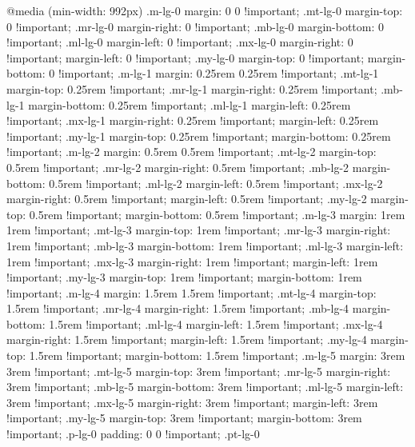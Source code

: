 {{{{{{{{{{{{{{{{{{{{{{{{{{{{{{{{{{{{{{{{{{{{{{{{{{{{{{{{{{{{{{{{{{{{{{{{{{{{{{{{{{{{{{{{{{{{{{{{{{{{{{{{{{{{{{{{{{{{{{{{{{{{{{{{{{{{{{{{{{{{{{{{{{{{{{{{{{{{{{{{{{{{{{{{{{{{{{{{{{{{{{{{{{{{{{{{{{{{{{{{{{{{{{{{{{{{{{{{{{{{{{{{{{{{{{{{{{{{{{{{{{{{{{{{{{{{{{{{{{{{{{{{{{{{{{{{{{{{{{{{{{{{{{{{{{{{{{{{{{{{{{{{{{@media (min-width: 992px) {
  .m-lg-0 {
    margin: 0 0 !important; }
  .mt-lg-0 {
    margin-top: 0 !important; }
  .mr-lg-0 {
    margin-right: 0 !important; }
  .mb-lg-0 {
    margin-bottom: 0 !important; }
  .ml-lg-0 {
    margin-left: 0 !important; }
  .mx-lg-0 {
    margin-right: 0 !important;
    margin-left: 0 !important; }
  .my-lg-0 {
    margin-top: 0 !important;
    margin-bottom: 0 !important; }
  .m-lg-1 {
    margin: 0.25rem 0.25rem !important; }
  .mt-lg-1 {
    margin-top: 0.25rem !important; }
  .mr-lg-1 {
    margin-right: 0.25rem !important; }
  .mb-lg-1 {
    margin-bottom: 0.25rem !important; }
  .ml-lg-1 {
    margin-left: 0.25rem !important; }
  .mx-lg-1 {
    margin-right: 0.25rem !important;
    margin-left: 0.25rem !important; }
  .my-lg-1 {
    margin-top: 0.25rem !important;
    margin-bottom: 0.25rem !important; }
  .m-lg-2 {
    margin: 0.5rem 0.5rem !important; }
  .mt-lg-2 {
    margin-top: 0.5rem !important; }
  .mr-lg-2 {
    margin-right: 0.5rem !important; }
  .mb-lg-2 {
    margin-bottom: 0.5rem !important; }
  .ml-lg-2 {
    margin-left: 0.5rem !important; }
  .mx-lg-2 {
    margin-right: 0.5rem !important;
    margin-left: 0.5rem !important; }
  .my-lg-2 {
    margin-top: 0.5rem !important;
    margin-bottom: 0.5rem !important; }
  .m-lg-3 {
    margin: 1rem 1rem !important; }
  .mt-lg-3 {
    margin-top: 1rem !important; }
  .mr-lg-3 {
    margin-right: 1rem !important; }
  .mb-lg-3 {
    margin-bottom: 1rem !important; }
  .ml-lg-3 {
    margin-left: 1rem !important; }
  .mx-lg-3 {
    margin-right: 1rem !important;
    margin-left: 1rem !important; }
  .my-lg-3 {
    margin-top: 1rem !important;
    margin-bottom: 1rem !important; }
  .m-lg-4 {
    margin: 1.5rem 1.5rem !important; }
  .mt-lg-4 {
    margin-top: 1.5rem !important; }
  .mr-lg-4 {
    margin-right: 1.5rem !important; }
  .mb-lg-4 {
    margin-bottom: 1.5rem !important; }
  .ml-lg-4 {
    margin-left: 1.5rem !important; }
  .mx-lg-4 {
    margin-right: 1.5rem !important;
    margin-left: 1.5rem !important; }
  .my-lg-4 {
    margin-top: 1.5rem !important;
    margin-bottom: 1.5rem !important; }
  .m-lg-5 {
    margin: 3rem 3rem !important; }
  .mt-lg-5 {
    margin-top: 3rem !important; }
  .mr-lg-5 {
    margin-right: 3rem !important; }
  .mb-lg-5 {
    margin-bottom: 3rem !important; }
  .ml-lg-5 {
    margin-left: 3rem !important; }
  .mx-lg-5 {
    margin-right: 3rem !important;
    margin-left: 3rem !important; }
  .my-lg-5 {
    margin-top: 3rem !important;
    margin-bottom: 3rem !important; }
  .p-lg-0 {
    padding: 0 0 !important; }
  .pt-lg-0 {
}}}}}}}}}}}}}}}}}}}}}}}}}}}}}}}}}}}}}}}}}}}}}}}}}}}}}}}}}}}}}}}}}}}}}}}}}}}}}}}}}}}}}}}}}}}}}}}}}}}}}}}}}}}}}}}}}}}}}}}}}}}}}}}}}}}}}}}}}}}}}}}}}}}}}}}}}}}}}}}}}}}}}}}}}}}}}}}}}}}}}}}}}}}}}}}}}}}}}}}}}}}}}}}}}}}}}}}}}}}}}}}}}}}}}}}}}}}}}}}}}}}}}}}}}}}}}}}}}}}}}}}}}}}}}}}}}}}}}}}}}}}}}}}}}}}}}}}}}}}}}}}}}}}}
